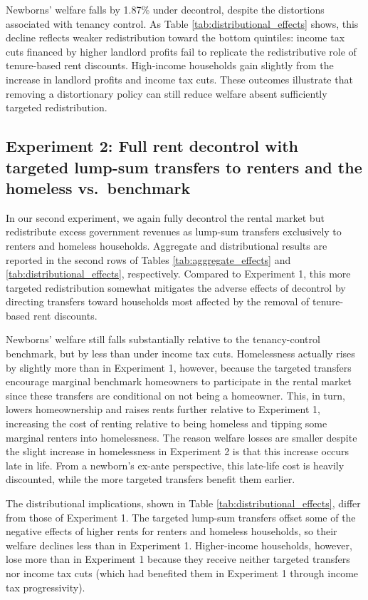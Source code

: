 \documentclass[parskip=full]{article}
\begin{document}
Newborns' welfare falls by 1.87\% under decontrol, despite the distortions associated with tenancy control. As Table \ref{tab:distributional_effects} shows, this decline reflects weaker redistribution toward the bottom quintiles: income tax cuts financed by higher landlord profits fail to replicate the redistributive role of tenure-based rent discounts. High-income households gain slightly from the increase in landlord profits and income tax cuts. These outcomes illustrate that removing a distortionary policy can still reduce welfare absent sufficiently targeted redistribution.

\subsection{Experiment 2: Full rent decontrol with targeted lump-sum transfers to renters and the homeless vs.\ benchmark}\label{sec:exp_2}

In our second experiment, we again fully decontrol the rental market but redistribute excess government revenues as lump-sum transfers exclusively to renters and homeless households. Aggregate and distributional results are reported in the second rows of Tables \ref{tab:aggregate_effects} and \ref{tab:distributional_effects}, respectively. Compared to Experiment 1, this more targeted redistribution somewhat mitigates the adverse effects of decontrol by directing transfers toward households most affected by the removal of tenure-based rent discounts. 

Newborns' welfare still falls substantially relative to the tenancy-control benchmark, but by less than under income tax cuts. Homelessness actually rises by slightly more than in Experiment 1, however, because the targeted transfers encourage marginal benchmark homeowners to participate in the rental market since these transfers are conditional on not being a homeowner. This, in turn, lowers homeownership and raises rents further relative to Experiment 1, increasing the cost of renting relative to being homeless and tipping some marginal renters into homelessness. The reason welfare losses are smaller despite the slight increase in homelessness in Experiment 2 is that this increase occurs late in life. From a newborn's ex-ante perspective, this late-life cost is heavily discounted, while the more targeted transfers benefit them earlier.

The distributional implications, shown in Table \ref{tab:distributional_effects}, differ from those of Experiment 1. The targeted lump-sum transfers offset some of the negative effects of higher rents for renters and homeless households, so their welfare declines less than in Experiment 1. Higher-income households, however, lose more than in Experiment 1 because they receive neither targeted transfers nor income tax cuts (which had benefited them in Experiment 1 through income tax progressivity).
\end{document}
